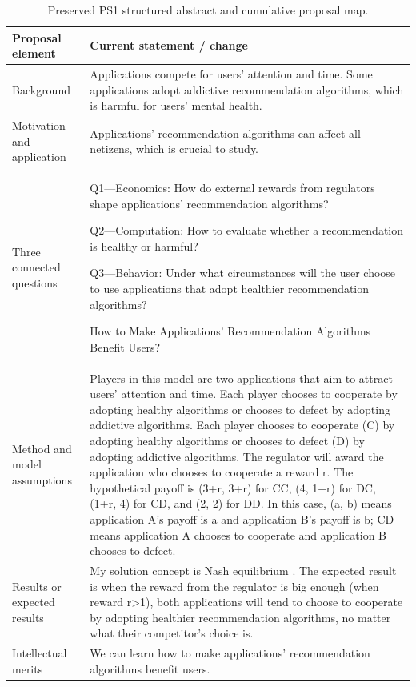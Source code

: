 \begin{table}[H]\caption{Preserved PS1 structured abstract and cumulative proposal map.}
\renewcommand{\arraystretch}{1.18}\begin{tabularx}{\textwidth}{@{}p{}Y@{}}
\toprule \textbf{Proposal element} & \textbf{Current statement / change}\\\midrule
Background & Applications compete for users' attention and time. Some applications adopt addictive recommendation algorithms, which is harmful for users' mental health.\\
Motivation and application & Applications' recommendation algorithms can affect all netizens, which is crucial to study.\\
Three connected questions & Q1---Economics: How do external rewards from regulators shape applications' recommendation algorithms?\par Q2---Computation: How to evaluate whether a recommendation is healthy or harmful?\par Q3---Behavior: Under what circumstances will the user choose to use applications that adopt healthier recommendation algorithms?\par How to Make Applications' Recommendation Algorithms Benefit Users?\\
Method and model assumptions & Players in this model are two applications that aim to attract users' attention and time. Each player chooses to cooperate by adopting healthy algorithms or chooses to defect by adopting addictive algorithms. Each player chooses to cooperate (C) by adopting healthy algorithms or chooses to defect (D) by adopting addictive algorithms. The regulator will award the application who chooses to cooperate a reward r. The hypothetical payoff is (3+r, 3+r) for CC, (4, 1+r) for DC, (1+r, 4) for CD, and (2, 2) for DD. In this case, (a, b) means application A's payoff is a and application B's payoff is b; CD means application A chooses to cooperate and application B chooses to defect.\\
Results or expected results & My solution concept is Nash equilibrium \cite{nash1950}. The expected result is when the reward from the regulator is big enough (when reward r>1), both applications will tend to choose to cooperate by adopting healthier recommendation algorithms, no matter what their competitor's choice is.\\
Intellectual merits & We can learn how to make applications' recommendation algorithms benefit users.\\

\end{tabularx}
\end{table}
